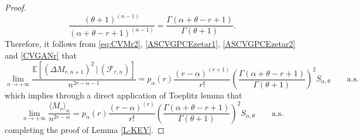 \documentclass[10pt,a4paper]{amsart}
\newcommand{\E}{\mathds{E}}
\begin{document}
\begin{proof}
\begin{equation}
\frac{(\theta+1)^{(n-1)}}{(\alpha+\theta-r+1)^{(n-1)}}=\frac{\Gamma(\alpha+\theta-r+1)}{\Gamma(\theta+1)}.
\end{equation}
Therefore, it follows from \eqref{eq:CVMr2}, \eqref{ASCVGPCEzetar1}, \eqref{ASCVGPCEzetar2} and \eqref{CVGANr} that
\begin{equation*}
\lim_{n\rightarrow+\infty} \frac{\E[(\Delta M_{r,n+1})^{2}\,|\,(\mathcal{F}_{r,n})]}{n^{2r-\alpha -1}}=
p_{\alpha}(r) \frac{(r-\alpha)^{(r+1)}}{r!} \left(\frac{\Gamma(\alpha+\theta-r+1)}{\Gamma(\theta+1)}\right)^2 S_{\alpha, \theta}  \qquad \text{a.s.}
\end{equation*}
which implies through a direct application of Toeplitz lemma that
\begin{equation*}
\lim_{n\rightarrow+\infty}\frac{\langle M_{r}\rangle_{n}}{n^{2r-\alpha}}=p_{\alpha}(r)\frac{(r-\alpha)^{(r)}}{r!}\left(\frac{\Gamma(\alpha+\theta-r+1)}{\Gamma(\theta+1)}\right)^{2}S_{\alpha,\theta}\qquad\text{a.s.}
\end{equation*}
completing the proof of Lemma \ref{L-KEY}.
\end{proof}
\end{document}
